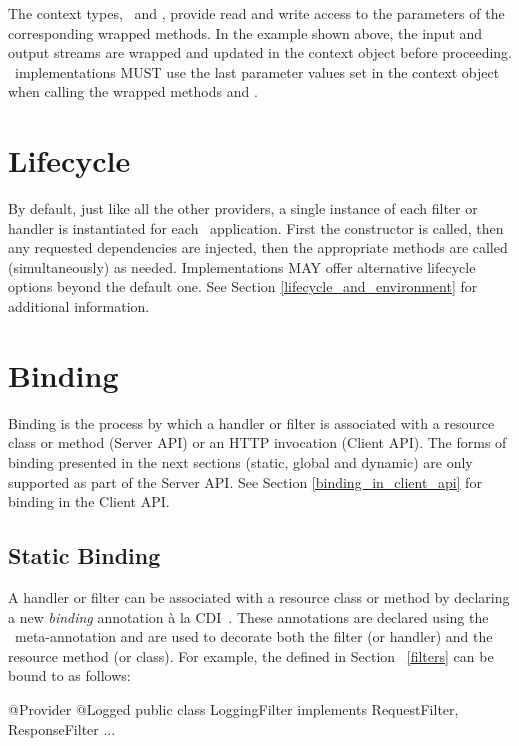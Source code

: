 The context types, \ReadFromHandlerContext\ and \WriteToHandlerContext, provide read and write access to the parameters of the corresponding wrapped methods. In the example shown above, the input and output streams are wrapped and updated in the context object before proceeding. \jaxrs\ implementations MUST use the last parameter values set in the context object when calling the wrapped methods  and .

\section{Lifecycle}

By default, just like all the other providers, a single instance of each filter or handler is instantiated for each \jaxrs\ application. First the constructor is called, then any requested dependencies are injected, then the appropriate methods are called (simultaneously) as needed. Implementations MAY offer alternative lifecycle options beyond the default one. See Section \ref{lifecycle_and_environment} for additional information.

\section{Binding}

Binding is the process by which a handler or filter is associated with a resource class or method (Server API) or an HTTP invocation (Client API). The forms of binding presented in the next sections (static, global and dynamic) are only supported as part of the Server API. See Section \ref{binding_in_client_api} for binding in the Client API.

\subsection{Static Binding}
\label{Static_Binding}

A handler or filter can be associated with a resource class or method by declaring a new \emph{binding} annotation \`{a} la CDI~\cite{jsr299}. These annotations are declared using the \jaxrs\ meta-annotation \NameBinding and are used to decorate both the filter (or handler) and the resource method (or class). For example, the  defined in Section ~\ref{filters} can be bound to  as follows:

\begin{listing}{1}
@Provider
@Logged
public class LoggingFilter implements RequestFilter, ResponseFilter {
    ...
}
\end{listing}

